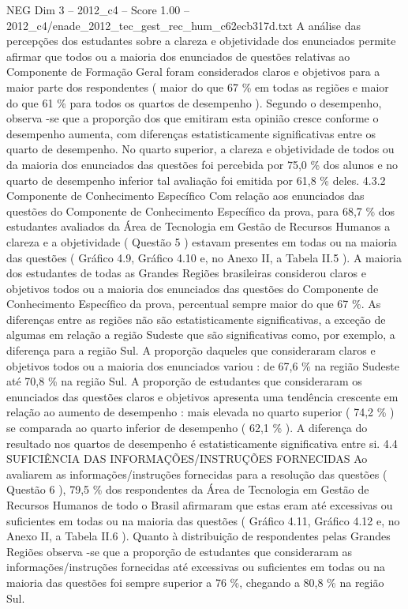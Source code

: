 \begin{textsample}{NEG Dim 3 – 2012\_c4 – Score 1.00 – 2012\_c4/enade\_2012\_tec\_gest\_rec\_hum\_c62ecb317d.txt}
A análise das percepções dos estudantes sobre a clareza e objetividade dos enunciados permite afirmar que todos ou a maioria dos enunciados de questões relativas ao Componente de Formação Geral foram considerados claros e objetivos para a maior parte dos respondentes ( maior do que 67 \% em todas as regiões e maior do que 61 \% para todos os quartos de desempenho ).
Segundo o desempenho, observa -se que a proporção dos que emitiram esta opinião cresce conforme o desempenho aumenta, com diferenças estatisticamente significativas entre os quarto de desempenho.
No quarto superior, a clareza e objetividade de todos ou da maioria dos enunciados das questões foi percebida por 75,0 \% dos alunos e no quarto de desempenho inferior tal avaliação foi emitida por 61,8 \% deles. 4.3.2 Componente de Conhecimento Específico Com relação aos enunciados das questões do Componente de Conhecimento Específico da prova, para 68,7 \% dos estudantes avaliados da Área de Tecnologia em Gestão de Recursos Humanos a clareza e a objetividade ( Questão 5 ) estavam presentes em todas ou na maioria das questões ( Gráfico 4.9, Gráfico 4.10 e, no Anexo II, a Tabela II.5 ).
A maioria dos estudantes de todas as Grandes Regiões brasileiras considerou claros e objetivos todos ou a maioria dos enunciados das questões do Componente de Conhecimento Específico da prova, percentual sempre maior do que 67 \%.
As diferenças entre as regiões não são estatisticamente significativas, a exceção de algumas em relação a região Sudeste que são significativas como, por exemplo, a diferença para a região Sul.
A proporção daqueles que consideraram claros e objetivos todos ou a maioria dos enunciados variou : de 67,6 \% na região Sudeste até 70,8 \% na região Sul.
A proporção de estudantes que consideraram os enunciados das questões claros e objetivos apresenta uma tendência crescente em relação ao aumento de desempenho : mais elevada no quarto superior ( 74,2 \% ) se comparada ao quarto inferior de desempenho ( 62,1 \% ).
A diferença do resultado nos quartos de desempenho é estatisticamente significativa entre si. 4.4 SUFICIÊNCIA DAS INFORMAÇÕES/INSTRUÇÕES FORNECIDAS Ao avaliarem as informações/instruções fornecidas para a resolução das questões ( Questão 6 ), 79,5 \% dos respondentes da Área de Tecnologia em Gestão de Recursos Humanos de todo o Brasil afirmaram que estas eram até excessivas ou suficientes em todas ou na maioria das questões ( Gráfico 4.11, Gráfico 4.12 e, no Anexo II, a Tabela II.6 ).
Quanto à distribuição de respondentes pelas Grandes Regiões observa -se que a proporção de estudantes que consideraram as informações/instruções fornecidas até excessivas ou suficientes em todas ou na maioria das questões foi sempre superior a 76 \%, chegando a 80,8 \% na região Sul.

\end{textsample}
